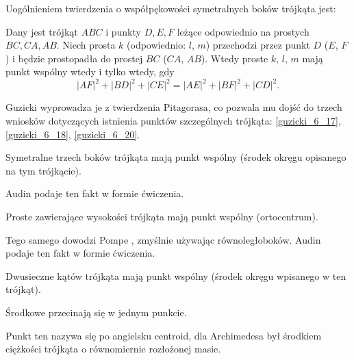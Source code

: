 %

Uogólnieniem twierdzenia o współpękowości symetralnych boków trójkąta jest:

\begin{proposition}
\label{guzicki_6_13}%
	Dany jest trójkąt $ABC$ i punkty $D, E, F$ leżące odpowiednio na prostych $BC, CA, AB$.
	Niech prosta $k$ (odpowiednio: $l$, $m$) przechodzi przez punkt $D$ ($E$, $F$) i będzie prostopadła do prostej $BC$ ($CA$, $AB$).
	Wtedy proste $k$, $l$, $m$ mają punkt wspólny wtedy i tylko wtedy, gdy
	\begin{equation}
		|AF|^2 + |BD|^2 + |CE|^2 = |AE|^2 + |BF|^2 + |CD|^2.
	\end{equation}
\end{proposition}

Guzicki \cite[s. 176]{guzicki_2021} wyprowadza je z twierdzenia Pitagorasa, co pozwala mu dojść do trzech wniosków dotyczących istnienia punktów szczególnych trójkąta: \ref{guzicki_6_17}, \ref{guzicki_6_18}, \ref{guzicki_6_20}.

\begin{corollary}
\label{guzicki_6_17}%
    Symetralne trzech boków trójkąta mają punkt wspólny (środek okręgu opisanego na tym trójkącie).
\end{corollary}

Audin \cite[s. 61]{audin_2003} podaje ten fakt w formie ćwiczenia.


\begin{corollary}
\label{guzicki_6_18}%
    Proste zawierające wysokości trójkąta mają punkt wspólny (ortocentrum).
%
\end{corollary}

Tego samego dowodzi Pompe \cite[s. 38]{pompe_2022}, zmyślnie używając równoległoboków.
Audin \cite[s. 61]{audin_2003} podaje ten fakt w formie ćwiczenia.

\begin{corollary} %
\label{guzicki_6_20}%
    Dwusieczne kątów trójkąta mają punkt wspólny (środek okręgu wpisanego w ten trójkąt).
\end{corollary}

Środkowe przecinają się w jednym punkcie. %

Punkt ten nazywa się po angielsku centroid, dla Archimedesa był środkiem ciężkości trójkąta o równomiernie rozłożonej masie.

%
